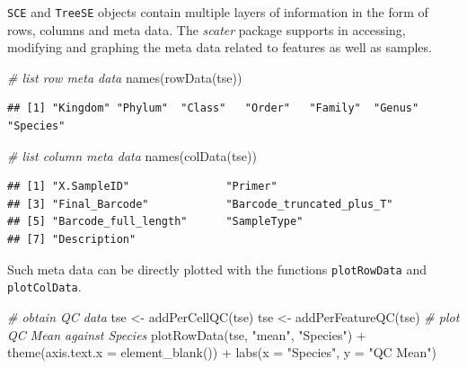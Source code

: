 \documentclass[
]{book}
\newenvironment{Shaded}{\begin{snugshade}}{\end{snugshade}}
\newcommand{\AttributeTok}[1]{\textcolor[rgb]{0.77,0.63,0.00}{#1}}
\newcommand{\CommentTok}[1]{\textcolor[rgb]{0.56,0.35,0.01}{\textit{#1}}}
\newcommand{\FunctionTok}[1]{\textcolor[rgb]{0.00,0.00,0.00}{#1}}
\newcommand{\NormalTok}[1]{#1}
\newcommand{\OtherTok}[1]{\textcolor[rgb]{0.56,0.35,0.01}{#1}}
\newcommand{\SpecialCharTok}[1]{\textcolor[rgb]{0.00,0.00,0.00}{#1}}
\newcommand{\StringTok}[1]{\textcolor[rgb]{0.31,0.60,0.02}{#1}}
\begin{document}
\texttt{SCE} and \texttt{TreeSE} objects contain multiple layers of information in the
form of rows, columns and meta data. The \emph{scater} package supports in
accessing, modifying and graphing the meta data related to features as
well as samples.

\begin{Shaded}
\begin{Highlighting}[]
\CommentTok{\# list row meta data}
\FunctionTok{names}\NormalTok{(}\FunctionTok{rowData}\NormalTok{(tse))}
\end{Highlighting}
\end{Shaded}

\begin{verbatim}
## [1] "Kingdom" "Phylum"  "Class"   "Order"   "Family"  "Genus"   "Species"
\end{verbatim}

\begin{Shaded}
\begin{Highlighting}[]
\CommentTok{\# list column meta data}
\FunctionTok{names}\NormalTok{(}\FunctionTok{colData}\NormalTok{(tse))}
\end{Highlighting}
\end{Shaded}

\begin{verbatim}
## [1] "X.SampleID"               "Primer"                  
## [3] "Final_Barcode"            "Barcode_truncated_plus_T"
## [5] "Barcode_full_length"      "SampleType"              
## [7] "Description"
\end{verbatim}

Such meta data can be directly plotted with the functions
\texttt{plotRowData} and \texttt{plotColData}.

\begin{Shaded}
\begin{Highlighting}[]
\CommentTok{\# obtain QC data}
\NormalTok{tse }\OtherTok{\textless{}{-}} \FunctionTok{addPerCellQC}\NormalTok{(tse)}
\NormalTok{tse }\OtherTok{\textless{}{-}} \FunctionTok{addPerFeatureQC}\NormalTok{(tse)}
\CommentTok{\# plot QC Mean against Species}
\FunctionTok{plotRowData}\NormalTok{(tse, }\StringTok{"mean"}\NormalTok{, }\StringTok{"Species"}\NormalTok{) }\SpecialCharTok{+}
  \FunctionTok{theme}\NormalTok{(}\AttributeTok{axis.text.x =} \FunctionTok{element\_blank}\NormalTok{()) }\SpecialCharTok{+}
  \FunctionTok{labs}\NormalTok{(}\AttributeTok{x =} \StringTok{"Species"}\NormalTok{, }\AttributeTok{y =} \StringTok{"QC Mean"}\NormalTok{)}
\end{Highlighting}
\end{Shaded}
\end{document}

